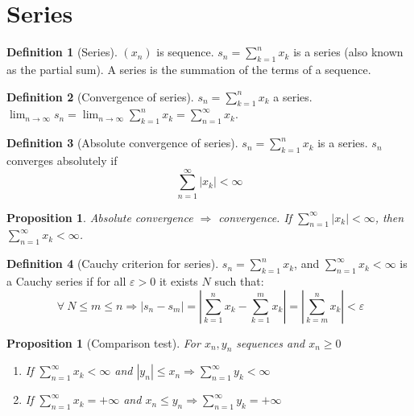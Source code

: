 \documentclass{article}
\newcommand{\DS}{\displaystyle}
\newcommand{\abs}[1]{\left|#1\right|}
\newcommand{\Ar}{\Rightarrow}
\newenvironment{enumrom}{\begin{enumerate}[label=(\roman*)]}{\end{enumerate}}
\newcommand{\limn}{\lim_{n \to \infty}}
\theoremstyle{definition}
\newtheorem{definition}{Definition}[section]
\theoremstyle{definition}
\theoremstyle{plain}
\theoremstyle{plain}
\theoremstyle{plain}
\theoremstyle{plain}
\newtheorem{proposition}[theorem]{Proposition}
\theoremstyle{definition}
\theoremstyle{remark}
\theoremstyle{remark}
\theoremstyle{remark}
\theoremstyle{remark}
\newcommand{\sumn}{\sum_{k=1}^n}
\newcommand{\series}{\sum_{n=1}^\infty}
\newcommand{\ForAll}{\ \forall \ }
\newcommand{\E}{\varepsilon}
\begin{document}
\section{Series}


\begin{definition}[Series]
  $(x_n)$ is sequence. $\DS s_n = \sumn{x_k}$ is a series (also known as the partial sum). A series is the summation of the terms of a sequence.
\end{definition}


\begin{definition}[Convergence of series]
  $\DS s_n = \sumn{x_k}$ a series. $\DS \limn s_n = \limn \sumn{x_k} = \series{x_k}$.
\end{definition}



\begin{definition}[Absolute convergence of series]
  $\DS s_n = \sumn{x_k}$ is a series. $s_n$ converges absolutely if
  \[\DS \series{\abs{x_k}} < \infty\]
\end{definition}


\begin{proposition}
  Absolute convergence $\Ar$ convergence. If $\DS \series{\abs{x_k}} < \infty$, then $\DS \series{x_k} < \infty$.
\end{proposition}



\begin{definition}[Cauchy criterion for series]
  $\DS s_n = \sumn{x_k}$, and $\DS \series{x_k} < \infty$ is a Cauchy series if for all $\E > 0$ it exists $N$ such that:
  \[
    \ForAll N \leq m \leq n \Ar \abs{s_n - s_m} =
    \abs{\sumn{x_k} - \sum_{k=1}^m x_k} = \abs{\sum_{k=m}^n x_k} < \E
  \]
\end{definition}


\begin{proposition}[Comparison test]
  For $x_n, y_n$ sequences and $x_n \geq 0$
  \begin{enumrom}
    \item If $\DS \series{x_k} < \infty$ and $\abs{y_n} \leq x_n \DS \Ar \series{y_k} < \infty$
    \item If $\DS \series{x_k} = +\infty$ and $x_n \leq y_n \DS \Ar \series{y_k} = +\infty$
  \end{enumrom}
\end{proposition}
\end{document}
